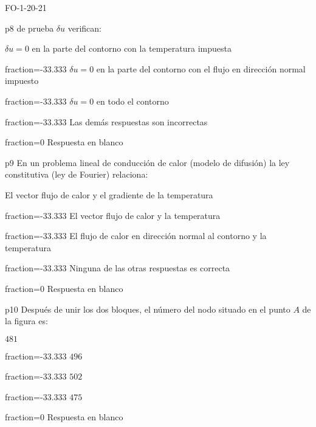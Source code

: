 \documentclass[a4paper]{article}
\begin{document}
\begin{quiz}{FO-1-20-21}
\begin{multi}{p8}
	de prueba $\delta u$  verifican:
	\item* $\delta u=0$ en la parte del contorno con la temperatura impuesta
	\item[fraction=-33.333] $\delta u=0$ en la parte del contorno con el flujo
	en direcci\'on normal impuesto
	\item[fraction=-33.333] $\delta u=0$ en todo el contorno
	\item[fraction=-33.333] Las dem\'as respuestas son incorrectas
	\item[fraction=0] Respuesta en blanco
\end{multi}
\begin{multi}{p9}
En un problema lineal de conducci\'on de calor (modelo de difusi\'on) la ley
constitutiva (ley de Fourier) relaciona:
	\item* El vector flujo de calor y el gradiente de la temperatura
	\item[fraction=-33.333] El vector flujo de calor y la temperatura
	\item[fraction=-33.333] El flujo de calor en direcci\'on normal al contorno y la temperatura
	\item[fraction=-33.333] Ninguna de las otras respuestas es correcta
	\item[fraction=0] Respuesta en blanco
\end{multi}
\begin{multi}{p10}
	Despu\'es de unir los dos bloques, el n\'umero del nodo situado en el punto $A$ de la figura es:
	\item* $481$
	\item[fraction=-33.333] $496$
	\item[fraction=-33.333] $502$
	\item[fraction=-33.333] $475$
	\item[fraction=0] Respuesta en blanco
\end{multi}

\end{quiz}
\end{document}
